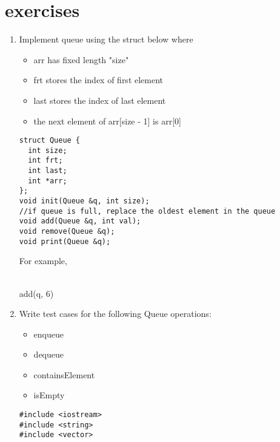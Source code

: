 \documentclass[12pt]{article}
\begin{document}
 \section{exercises}
 \begin{enumerate}
    \item Implement queue using the struct below where 
    \begin{itemize}
        \item arr has fixed length "size"
        \item frt stores the index of first element
        \item last stores the index of last element
        \item the next element of arr[size - 1] is arr[0]
    \end{itemize}
    \begin{verbatim}
struct Queue {
  int size;
  int frt;
  int last;
  int *arr;
};
void init(Queue &q, int size);
//if queue is full, replace the oldest element in the queue
void add(Queue &q, int val);
void remove(Queue &q);
void print(Queue &q);
    \end{verbatim}    
    For example,\\
    \\
    add(q, 6)\\
    
    \newpage \item Write test cases for the following Queue operations:
    \begin{itemize}
        \item enqueue
        \item dequeue
        \item containsElement
        \item isEmpty
    \end{itemize}
    \begin{verbatim}
#include <iostream>
#include <string>
#include <vector>


\end{verbatim}
\end{enumerate}
\end{document}

